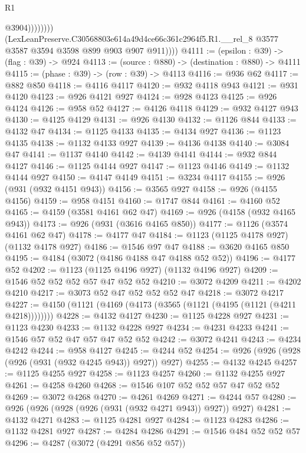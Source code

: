 \begin{lexlean}{R1}
\begin{coremodule}
                          @3904))))))))
          (LexLeanPreserve.C30568803e614a49d4ce66c361c2964f5.R1.__rel_8
            @3577
            @3587
            @3594
            @3598
            @899
            @903
            @907
            @911))))
@4111 := (epsilon : @39) -> (flag : @39) -> @924
@4113 := (source : @880) -> (destination : @880) -> @4111
@4115 := (phase : @39) -> (row : @39) -> @4113
@4116 := @936 @62
@4117 := @882 @850
@4118 := @4116 @4117
@4120 := @932 @4118 @943
@4121 := @931 @4120
@4123 := @926 @4121 @927
@4124 := @928 @4123
@4125 := @926 @4124
@4126 := @958 @52
@4127 := @4126 @4118
@4129 := @932 @4127 @943
@4130 := @4125 @4129
@4131 := @926 @4130
@4132 := @1126 @844
@4133 := @4132 @47
@4134 := @1125 @4133
@4135 := @4134 @927
@4136 := @1123 @4135
@4138 := @1132 @4133 @927
@4139 := @4136 @4138
@4140 := @3084 @47
@4141 := @1137 @4140
@4142 := @4139 @4141
@4144 := @932 @844 @4127
@4146 := @1125 @4144 @927
@4147 := @1123 @4146
@4149 := @1132 @4144 @927
@4150 := @4147 @4149
@4151 := @3234 @4117
@4155 := @926 (@931 (@932 @4151 @943))
@4156 := @3565 @927
@4158 := @926 (@4155 @4156)
@4159 := @958 @4151
@4160 := @1747 @844
@4161 := @4160 @52
@4165 := @4159 (@3581 @4161 @62 @47)
@4169 := @926 (@4158 (@932 @4165 @943))
@4173 := @926 (@931 (@3616 @4165 @850))
@4177 := @1126 (@3574 @4161 @62 @47)
@4178 := @4177 @47
@4184 := @1123 (@1125 @4178 @927) (@1132 @4178 @927)
@4186 := @1546 @97 @47
@4188 := @3620 @4165 @850
@4195 := @4184 (@3072 (@4186 @4188 @47 @4188 @52 @52))
@4196 := @4177 @52
@4202 := @1123 (@1125 @4196 @927) (@1132 @4196 @927)
@4209 := @1546 @52 @52 @52 @57 @47 @52 @52
@4210 := @3072 @4209
@4211 := @4202 @4210
@4217 := @3073 @52 @47 @52 @52 @52 @47
@4218 := @3072 @4217
@4227 := @4150 (@1121 (@4169 (@4173 (@3565 (@1121 (@4195 (@1121 (@4211 @4218))))))))
@4228 := @4132 @4127
@4230 := @1125 @4228 @927
@4231 := @1123 @4230
@4233 := @1132 @4228 @927
@4234 := @4231 @4233
@4241 := @1546 @57 @52 @47 @57 @47 @52 @52
@4242 := @3072 @4241
@4243 := @4234 @4242
@4244 := @958 @4127
@4245 := @4244 @52
@4254 := @926 (@926 (@928 (@926 (@931 (@932 @4245 @943)) @927)) @927)
@4255 := @4132 @4245
@4257 := @1125 @4255 @927
@4258 := @1123 @4257
@4260 := @1132 @4255 @927
@4261 := @4258 @4260
@4268 := @1546 @107 @52 @52 @57 @47 @52 @52
@4269 := @3072 @4268
@4270 := @4261 @4269
@4271 := @4244 @57
@4280 := @926 (@926 (@928 (@926 (@931 (@932 @4271 @943)) @927)) @927)
@4281 := @4132 @4271
@4283 := @1125 @4281 @927
@4284 := @1123 @4283
@4286 := @1132 @4281 @927
@4287 := @4284 @4286
@4291 := @1546 @484 @52 @52 @57
@4296 := @4287 (@3072 (@4291 @856 @52 @57))

\end{coremodule}
\end{lexlean}
